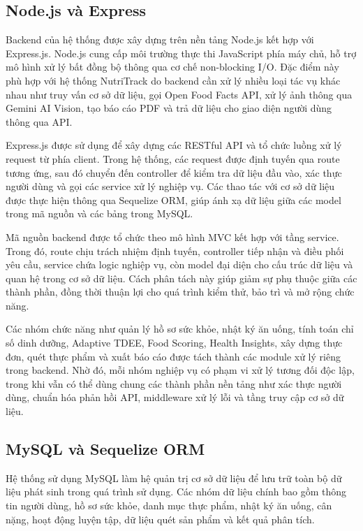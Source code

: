 \documentclass[12pt, a4paper]{report}
\begin{document}
\subsection{Node.js và Express}Backend của hệ thống được xây dựng trên nền tảng Node.js kết hợp với Express.js. Node.js cung cấp môi trường thực thi JavaScript phía máy chủ, hỗ trợ mô hình xử lý bất đồng bộ thông qua cơ chế non-blocking I/O. Đặc điểm này phù hợp với hệ thống NutriTrack do backend cần xử lý nhiều loại tác vụ khác nhau như truy vấn cơ sở dữ liệu, gọi Open Food Facts API, xử lý ảnh thông qua Gemini AI Vision, tạo báo cáo PDF và trả dữ liệu cho giao diện người dùng thông qua API.

Express.js được sử dụng để xây dựng các RESTful API và tổ chức luồng xử lý request từ phía client. Trong hệ thống, các request được định tuyến qua route tương ứng, sau đó chuyển đến controller để kiểm tra dữ liệu đầu vào, xác thực người dùng và gọi các service xử lý nghiệp vụ. Các thao tác với cơ sở dữ liệu được thực hiện thông qua Sequelize ORM, giúp ánh xạ dữ liệu giữa các model trong mã nguồn và các bảng trong MySQL.

Mã nguồn backend được tổ chức theo mô hình MVC kết hợp với tầng service. Trong đó, route chịu trách nhiệm định tuyến, controller tiếp nhận và điều phối yêu cầu, service chứa logic nghiệp vụ, còn model đại diện cho cấu trúc dữ liệu và quan hệ trong cơ sở dữ liệu. Cách phân tách này giúp giảm sự phụ thuộc giữa các thành phần, đồng thời thuận lợi cho quá trình kiểm thử, bảo trì và mở rộng chức năng.

Các nhóm chức năng như quản lý hồ sơ sức khỏe, nhật ký ăn uống, tính toán chỉ số dinh dưỡng, Adaptive TDEE, Food Scoring, Health Insights, xây dựng thực đơn, quét thực phẩm và xuất báo cáo được tách thành các module xử lý riêng trong backend. Nhờ đó, mỗi nhóm nghiệp vụ có phạm vi xử lý tương đối độc lập, trong khi vẫn có thể dùng chung các thành phần nền tảng như xác thực người dùng, chuẩn hóa phản hồi API, middleware xử lý lỗi và tầng truy cập cơ sở dữ liệu.

\subsection{MySQL và Sequelize ORM}Hệ thống sử dụng MySQL làm hệ quản trị cơ sở dữ liệu để lưu trữ toàn bộ dữ liệu phát sinh trong quá trình sử dụng. Các nhóm dữ liệu chính bao gồm thông tin người dùng, hồ sơ sức khỏe, danh mục thực phẩm, nhật ký ăn uống, cân nặng, hoạt động luyện tập, dữ liệu quét sản phẩm và kết quả phân tích.
\end{document}

